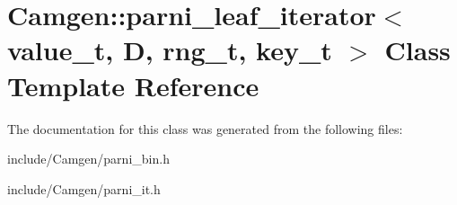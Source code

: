 \hypertarget{a00389}{\section{Camgen\-:\-:parni\-\_\-leaf\-\_\-iterator$<$ value\-\_\-t, D, rng\-\_\-t, key\-\_\-t $>$ Class Template Reference}
\label{a00389}
}


The documentation for this class was generated from the following files\-:\begin{DoxyCompactItemize}
\item 
include/\-Camgen/parni\-\_\-bin.\-h\item 
include/\-Camgen/parni\-\_\-it.\-h\end{DoxyCompactItemize}
